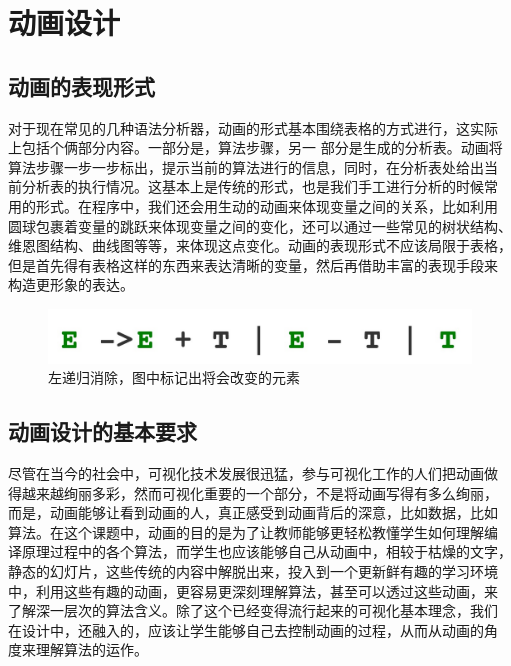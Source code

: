 \section{动画设计}
\subsection{动画的表现形式}
对于现在常见的几种语法分析器，动画的形式基本围绕表格的方式进行，这实际
上包括个俩部分内容。一部分是，算法步骤，另一 部分是生成的分析表。动画将
算法步骤一步一步标出，提示当前的算法进行的信息，同时，在分析表处给出当
前分析表的执行情况。这基本上是传统的形式，也是我们手工进行分析的时候常
用的形式。在程序中，我们还会用生动的动画来体现变量之间的关系，比如利用
圆球包裹着变量的跳跃来体现变量之间的变化，还可以通过一些常见的树状结构、
维恩图结构、曲线图等等，来体现这点变化。动画的表现形式不应该局限于表格，
但是首先得有表格这样的东西来表达清晰的变量，然后再借助丰富的表现手段来
构造更形象的表达。
\begin{figure}
\centering
\includegraphics[width=0.7\linewidth]{img/recursive.jpg}
\caption{左递归消除，图中标记出将会改变的元素}
\label{fig:recursive.jpg}
\end{figure}
\subsection{动画设计的基本要求}
尽管在当今的社会中，可视化技术发展很迅猛，参与可视化工作的人们把动画做
得越来越绚丽多彩，然而可视化重要的一个部分，不是将动画写得有多么绚丽，
而是，动画能够让看到动画的人，真正感受到动画背后的深意，比如数据，比如
算法。在这个课题中，动画的目的是为了让教师能够更轻松教懂学生如何理解编
译原理过程中的各个算法，而学生也应该能够自己从动画中，相较于枯燥的文字，
静态的幻灯片，这些传统的内容中解脱出来，投入到一个更新鲜有趣的学习环境
中，利用这些有趣的动画，更容易更深刻理解算法，甚至可以透过这些动画，来
了解深一层次的算法含义。除了这个已经变得流行起来的可视化基本理念，我们
在设计中，还融入的，应该让学生能够自己去控制动画的过程，从而从动画的角
度来理解算法的运作。
